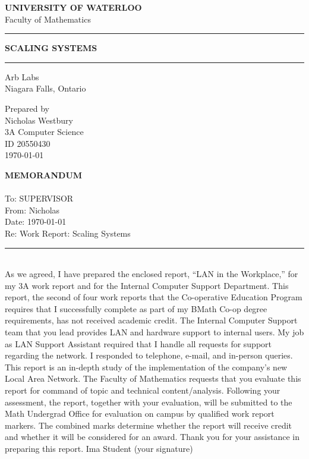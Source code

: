 \documentclass[12pt]{report}
\newcommand{\HRule}[1]{\rule{\linewidth}{#1}}
\begin{document}
\begin{titlepage}
   \begin{center}
    	\normalsize \textbf{\uppercase{University of Waterloo}} \\
		Faculty of Mathematics \\
	\end{center}	
	\begin{center}
		\HRule{0.5pt}
   		\LARGE \textbf{\uppercase{Scaling Systems}}
   		\HRule{0.5pt}
	\end{center}
	\begin{center}
	   		\normalsize {Arb Labs\\ Niagara Falls, Ontario}	
	 
	\end{center}
	\begin{center}
	   		\normalsize {Prepared by\\
				Nicholas Westbury\\
				3A Computer Science\\
				ID 20550430\\
	   		 	\today
	   		 }
	\end{center}
\end{titlepage}

\newpage\noindent\thispagestyle{empty}
\LARGE\textbf{\uppercase{MEMORANDUM}}\\ \\
\normalsize
To: SUPERVISOR\\
From: Nicholas\\
Date: \today\\
Re: Work Report: Scaling Systems\\
\HRule{1.5pt}\\

As we agreed, I have prepared the enclosed report, “LAN in the Workplace,” for
my 3A work report and for the Internal Computer Support Department. This
report, the second of four work reports that the Co-operative Education Program
requires that I successfully complete as part of my BMath Co-op degree
requirements, has not received academic credit.
The Internal Computer Support team that you lead provides LAN and hardware
support to internal users. My job as LAN Support Assistant required that I
handle all requests for support regarding the network. I responded to telephone,
e-mail, and in-person queries. This report is an in-depth study of the
implementation of the company’s new Local Area Network.
The Faculty of Mathematics requests that you evaluate this report for command
of topic and technical content/analysis. Following your assessment, the report,
together with your evaluation, will be submitted to the Math Undergrad Office
for evaluation on campus by qualified work report markers. The combined
marks determine whether the report will receive credit and whether it will be
considered for an award.
Thank you for your assistance in preparing this report.
Ima Student (your signature)\\
\end{document}
